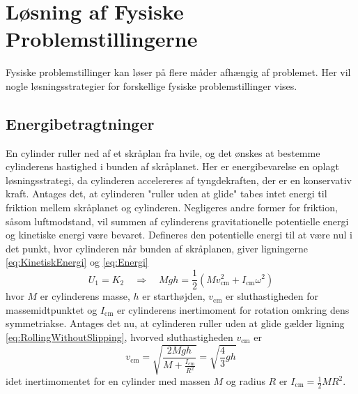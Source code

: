 \section{Løsning af Fysiske Problemstillingerne}
Fysiske problemstillinger kan løser på flere måder afhængig af problemet. Her vil nogle løsningsstrategier for forskellige fysiske problemstillinger vises.

\subsection{Energibetragtninger}
En cylinder ruller ned af et skråplan fra hvile, og det ønskes at bestemme cylinderens hastighed i bunden af skråplanet. Her er energibevarelse en oplagt løsningsstrategi, da cylinderen accelereres af tyngdekraften, der er en konservativ kraft. Antages det, at cylinderen "ruller uden at glide"  tabes intet energi til friktion mellem skråplanet og cylinderen. Negligeres andre former for friktion, såsom luftmodstand, vil summen af cylinderens gravitationelle potentielle energi og kinetiske energi være bevaret. Defineres den potentielle energi til at være nul i det punkt, hvor cylinderen når bunden af skråplanen, giver ligningerne \ref{eq:KinetiskEnergi} og \ref{eq:Energi}
\begin{equation}
    U_1 = K_2 \quad\Rightarrow\quad Mgh = \frac{1}{2}\left(Mv_\text{cm}^2 + I_\text{cm}\omega^2\right)
\end{equation}
hvor $M$ er cylinderens masse, $h$ er starthøjden, $v_\text{cm}$ er sluthastigheden for massemidtpunktet og $I_\text{cm}$ er cylinderens inertimoment for rotation omkring dens symmetriakse. Antages det nu, at cylinderen ruller uden at glide gælder ligning \ref{eq:RollingWithoutSlipping}, hvorved sluthastigheden $v_\text{cm}$ er
\begin{equation}
    v_\text{cm} = \sqrt{\frac{2Mgh}{M + \frac{I_\text{cm}}{R^2}}} = \sqrt{\frac{4}{3}gh}
\end{equation}
idet inertimomentet for en cylinder med massen $M$ og radius $R$ er $I_\text{cm}=\frac{1}{2}MR^2$.

